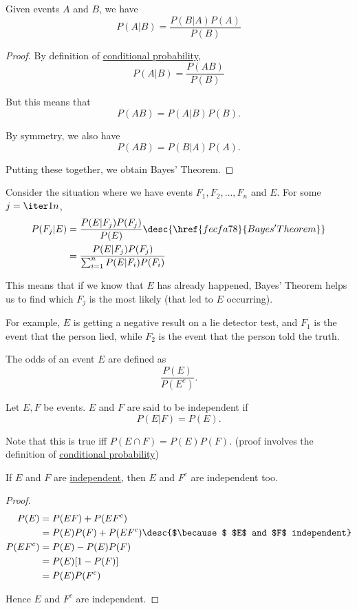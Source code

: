 \label{fecfa78}

Given events $A$ and $B$, we have
$$
  P(A|B)=\frac{P(B|A)P(A)}{P(B)}
$$

\begin{proof}
  By definition of \href{b076095}{conditional probability},
  $$
    P(A|B)=\frac{P(AB)}{P(B)}
  $$

  But this means that
  $$
    P(AB)=P(A|B)P(B).
  $$

  By symmetry, we also have
  $$
    P(AB)=P(B|A)P(A).
  $$

  Putting these together, we obtain Bayes' Theorem.
\end{proof}

\label{be51d24}

Consider the situation where we have events $F_1,F_2,\ldots,F_n$ and $E$. For
some $j=\iter1n$,
\begin{align*}
  P(F_j|E) &=\frac{P(E|F_j)P(F_j)}{P(E)}\desc{\href{fecfa78}{Bayes' Theorem}} \\
           &= \frac{P(E|F_j)P(F_j)}{\sum_{i=1}^nP(E|F_i)P(F_i)}
\end{align*}

This means that if we know that $E$ has already happened, Bayes' Theorem helps
us to find which $F_j$ is the most likely (that led to $E$ occurring).

For example, $E$ is getting a negative result on a lie detector test, and $F_1$
is the event that the person lied, while $F_2$ is the event that the person
told the truth.

\label{c69ee67}

The odds of an event $E$ are defined as
$$
  \dfrac{P(E)}{P(E^c)}.
$$

\label{cb4d04c}

Let $E,F$ be events. $E$ and $F$ are said to be independent if
$$
  P(E|F)=P(E).
$$

Note that this is true iff $P(E\cap F)=P(E)P(F)$. (proof involves the
definition of \href{b076095}{conditional probability})

\label{ddf1030}

If $E$ and $F$ are \href{cb4d04c}{independent}, then $E$ and $F^c$ are
independent too.

\begin{proof}
  \begin{align*}
    P(E)    &=P(EF)+P(EF^c)                                             \\
            &=P(E)P(F)+P(EF^c)\desc{$\because$ $E$ and $F$ independent} \\
    P(EF^c) &=P(E)-P(E)P(F)                                             \\
            &=P(E)[1-P(F)]                                              \\
            &=P(E)P(F^c)
  \end{align*}

  Hence $E$ and $F^c$ are independent.
\end{proof}

